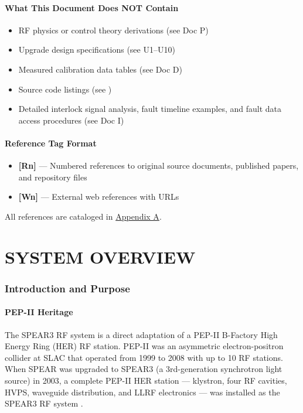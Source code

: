 \subsection*{What This Document Does NOT Contain}\label{what-this-document-does-not-contain}

\begin{itemize}
\tightlist
\item
  RF physics or control theory derivations (see Doc P)
\item
  Upgrade design specifications (see U1--U10)
\item
  Measured calibration data tables (see Doc D)
\item
  Source code listings (see )
\item
  Detailed interlock signal analysis, fault timeline examples, and fault data access procedures (see Doc I)
\end{itemize}

\subsection*{Reference Tag Format}\label{reference-tag-format}

\begin{itemize}
\tightlist
\item
  \textbf{{[}Rn{]}} --- Numbered references to original source documents, published papers, and repository files
\item
  \textbf{{[}Wn{]}} --- External web references with URLs
\end{itemize}

All references are cataloged in \protect\hyperlink{appendix-a--source-document-reference-index}{Appendix A}.

\FloatBarrier\clearpage
\part{SYSTEM OVERVIEW}



\section{Introduction and Purpose}

\subsection{PEP-II Heritage}

The SPEAR3 RF system is a direct adaptation of a PEP-II B-Factory High Energy Ring (HER) RF station. PEP-II was an asymmetric electron-positron collider at SLAC that operated from 1999 to 2008 with up to 10 RF stations. When SPEAR was upgraded to SPEAR3 (a 3rd-generation synchrotron light source) in 2003, a complete PEP-II HER station --- klystron, four RF cavities, HVPS, waveguide distribution, and LLRF electronics --- was installed as the SPEAR3 RF system   .


